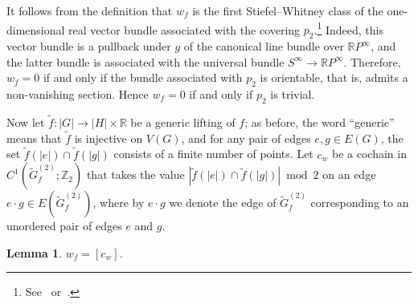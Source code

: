 \documentclass[a4paper,12pt,reqno,oneside]{amsart}
\theoremstyle{plain}
\newtheorem*{lemma*}{Lemma}
\theoremstyle{definition}
\theoremstyle{plain}
\newcommand{\from}{\colon}
\newcommand{\wt}[1]{\widetilde{#1}}
\newcommand{\R}{\mathbb{R}}
\newcommand{\RP}{\mathbb{R}P}
\newcommand{\Z}{\mathbb{Z}}
\begin{document}
It follows from the definition that $w_f$ is the first Stiefel–Whitney class of the one-dimensional
real vector bundle associated with the covering $p_2$.\footnote{See~\cite[Theorem
  3.1]{hatcher_bundles} or~\cite[Theorem 7.1]{milnor_stasheff}.} Indeed, this vector bundle is a
pullback under $g$ of the canonical line bundle over $\RP^\infty$, and the latter bundle is
associated with the universal bundle $S^\infty \to \RP^\infty$. Therefore, $w_f = 0$ if and only if
the bundle associated with $p_2$ is orientable, that is, admits a non-vanishing section. Hence
$w_f = 0$ if and only if $p_2$ is trivial.

Now let $\wt{f} \from |G| \to |H| \times \R$ be a generic lifting of $f$; as before, the word
``generic'' means that $\wt{f}$ is injective on $V(G)$, and for any pair of edges $e, g \in E(G)$,
the set $\wt{f}(|e|) \cap \wt{f}(|g|)$ consists of a finite number of points. Let $c_w$ be a cochain
in $C^1(\wt{G}^{(2)}_f; \Z_2)$ that takes the value $|\wt{f}(|e|) \cap \wt{f}(|g|)| \bmod{2}$ on an edge $e
\cdot g \in E(\wt{G}^{(2)}_f)$, where by $e \cdot g$ we denote the edge of $\wt{G}^{(2)}_f$
corresponding to an unordered pair of edges $e$ and $g$.

\begin{lemma*}
  $w_f = [c_w]$.
\end{lemma*}
\end{document}
